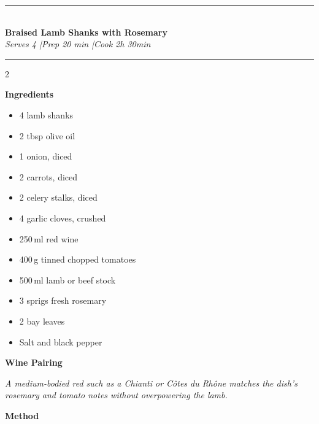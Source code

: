 \documentclass[a4paper,11pt]{article}
\newcommand{\recipetitle}[2]{%
  \begin{center}
    {\color{accent}\rule{0.4\linewidth}{1pt}}\\[4pt]
    {\Large\bfseries #1}\\[2pt]
    {\small\itshape #2}\\[2pt]
    {\color{accent}\rule{0.4\linewidth}{1pt}}
  \end{center}
  \vspace{0.6em}
}
\begin{document}
\recipetitle{Braised Lamb Shanks with Rosemary}{Serves 4 \quad|\quad Prep 20 min \quad|\quad Cook 2h 30min}

\begin{paracol}{2}
\setlength{\columnsep}{1.8em}

\begin{leftcolumn}
  {\color{accent}\bfseries Ingredients}
  \vspace{0.4em}

  \begin{itshape}
  \begin{itemize}[leftmargin=1.1em, itemsep=3pt, label={\color{accent}\textbullet}]
    \item 4 lamb shanks
    \item 2 tbsp olive oil
    \item 1 onion, diced
    \item 2 carrots, diced
    \item 2 celery stalks, diced
    \item 4 garlic cloves, crushed
    \item 250\,ml red wine
    \item 400\,g tinned chopped tomatoes
    \item 500\,ml lamb or beef stock
    \item 3 sprigs fresh rosemary
    \item 2 bay leaves
    \item Salt and black pepper
  \end{itemize}
  \end{itshape}

  \vspace{1em}
  {\color{accent}\bfseries Wine Pairing}
  \vspace{0.4em}

  \textit{A medium-bodied red such as a Chianti or Côtes du Rhône matches
  the dish's rosemary and tomato notes without overpowering the lamb.}
\end{leftcolumn}

\switchcolumn

  {\color{accent}\bfseries Method}
  \vspace{0.4em}


\end{paracol}
\end{document}
